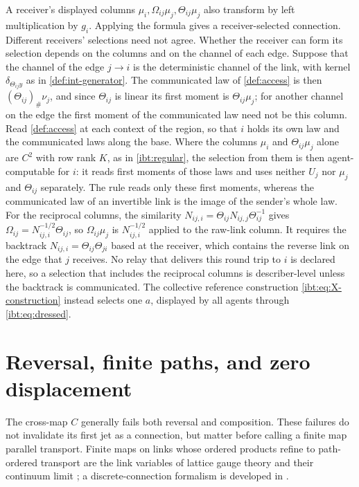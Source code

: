 A receiver's displayed columns $\mu_i,\Omega_{ij}\mu_j,\Theta_{ij}\mu_j$ also transform by left multiplication by $g_i$. Applying the formula gives a receiver-selected connection. Different receivers' selections need not agree. Whether the receiver can form its selection depends on the columns and on the channel of each edge. Suppose that the channel of the edge $j\to i$ is the deterministic channel of the link, with kernel $\delta_{\Theta_{ij}y}$ as in \cref{def:int-generator}. The communicated law of \cref{def:access} is then $(\Theta_{ij})_\#\nu_j$, and since $\Theta_{ij}$ is linear its first moment is $\Theta_{ij}\mu_j$; for another channel on the edge the first moment of the communicated law need not be this column. Read \cref{def:access} at each context of the region, so that $i$ holds its own law and the communicated laws along the base. Where the columns $\mu_i$ and $\Theta_{ij}\mu_j$ alone are $C^2$ with row rank $K$, as in \cref{ibt:regular}, the selection from them is then agent-computable for $i$: it reads first moments of those laws and uses neither $U_j$ nor $\mu_j$ and $\Theta_{ij}$ separately. The rule reads only these first moments, whereas the communicated law of an invertible link is the image of the sender's whole law. For the reciprocal columns, the similarity $N_{ij,i}=\Theta_{ij}N_{ij,j}\Theta_{ij}^{-1}$ gives $\Omega_{ij}=N_{ij,i}^{-1/2}\Theta_{ij}$, so $\Omega_{ij}\mu_j$ is $N_{ij,i}^{-1/2}$ applied to the raw-link column. It requires the backtrack $N_{ij,i}=\Theta_{ij}\Theta_{ji}$ based at the receiver, which contains the reverse link on the edge that $j$ receives. No relay that delivers this round trip to $i$ is declared here, so a selection that includes the reciprocal columns is describer-level unless the backtrack is communicated. The collective reference construction \cref{ibt:eq:X-construction} instead selects one $a$, displayed by all agents through \cref{ibt:eq:dressed}.

\section{Reversal, finite paths, and zero displacement}

The cross-map $C$ generally fails both reversal and composition. These failures do not invalidate its first jet as a connection, but matter before calling a finite map parallel transport. Finite maps on links whose ordered products refine to path-ordered transport are the link variables of lattice gauge theory and their continuum limit \citep{Wilson1974}; a discrete-connection formalism is developed in \citet{LeokMarsdenWeinstein2005}.

